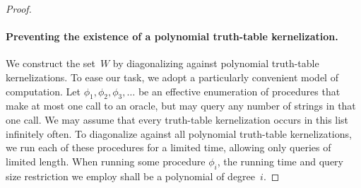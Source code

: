 \begin{proof}
  \paragraph{Preventing the existence of a polynomial truth-table kernelization.}
  We construct the set~$W$ by diagonalizing against polynomial truth-table kernelizations.
  To ease our task, we adopt a particularly convenient model of computation.
  Let $\phi_1, \phi_2, \phi_3, \ldots$ be an effective enumeration of procedures that make at most one call to an oracle, but may query any number of strings in that one call.
  We may assume that every truth-table kernelization occurs in this list infinitely often.
  To diagonalize against all polynomial truth-table kernelizations, we run each of these procedures for a limited time, allowing only queries of limited length.
  When running some procedure $\phi_i$, the running time and query size restriction we employ shall be a polynomial of degree~$i$.


\end{proof}
